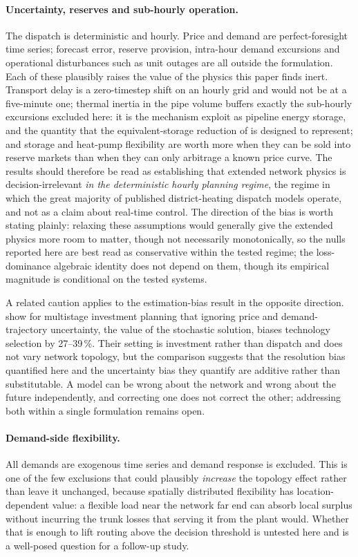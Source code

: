 \documentclass[a4paper,fleqn]{cas-sc}
\begin{document}
\paragraph{Uncertainty, reserves and sub-hourly operation.}
The dispatch is deterministic and hourly. Price and demand are perfect-foresight time
series; forecast error, reserve provision, intra-hour demand excursions and operational
disturbances such as unit outages are all outside the formulation. Each of these plausibly
raises the value of the physics this paper finds inert. Transport delay is a zero-timestep
shift on an hourly grid and would not be at a five-minute one; thermal inertia in the pipe
volume buffers exactly the sub-hourly excursions excluded here: it is the mechanism
\citet{Li2016_pipeline} exploit as pipeline energy storage, and the quantity that the
equivalent-storage reduction of \citet{Yang2024_equivalent} is designed to represent; and storage and heat-pump
flexibility are worth more when they can be sold into reserve markets than when they can
only arbitrage a known price curve. The results should therefore be read as establishing
that extended network physics is decision-irrelevant \emph{in the deterministic hourly
planning regime}, the regime in which the great majority of published district-heating
dispatch models operate, and not as a claim about real-time control. The direction of
the bias is worth stating plainly: relaxing these assumptions would generally give the
extended physics more room to matter, though not necessarily monotonically, so the nulls
reported here are best read as conservative within the tested regime; the loss-dominance
algebraic identity does not depend on them, though its empirical magnitude is conditional on
the tested systems.

A related caution applies to the estimation-bias result in the opposite direction.
\citet{Koek2026} show for multistage investment planning that ignoring price and
demand-trajectory uncertainty, the value of the stochastic solution, biases technology
selection by 27--39\,\%. Their setting is investment rather than dispatch and does not
vary network topology, but the comparison suggests that the resolution bias quantified
here and the uncertainty bias they quantify are additive rather than substitutable. A
model can be wrong about the network and wrong about the future independently, and
correcting one does not correct the other; addressing both within a single formulation
remains open.

\paragraph{Demand-side flexibility.}
All demands are exogenous time series and demand response is excluded. This is one of the
few exclusions that could plausibly \emph{increase} the topology effect rather than leave
it unchanged, because spatially distributed flexibility has location-dependent value: a
flexible load near the network far end can absorb local surplus without incurring the
trunk losses that serving it from the plant would. Whether that is enough to lift routing
above the decision threshold is untested here and is a well-posed question for a follow-up
study.
\end{document}
